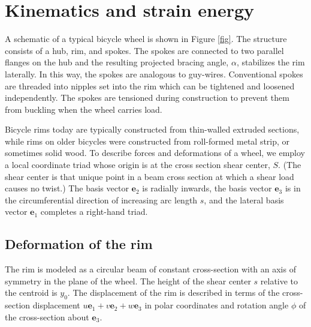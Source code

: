 \documentclass[\rootdir/thesis.tex]{subfiles}
\begin{document}
\section{Kinematics and strain energy}
A schematic of a typical bicycle wheel is shown in Figure \ref{fig}. The structure consists of a hub, rim, and spokes. The spokes are connected to two parallel flanges on the hub and the resulting projected bracing angle, $\alpha$,  stabilizes the rim laterally. In this way, the spokes are analogous to guy-wires. Conventional spokes are threaded into nipples set into the rim which can be tightened and loosened independently. The spokes are tensioned during construction to prevent them from buckling when the wheel carries load.

Bicycle rims today are typically constructed from thin-walled extruded sections, while rims on older bicycles were constructed from roll-formed metal strip, or sometimes solid wood. To describe forces and deformations of a wheel, we employ a local coordinate triad whose origin is at the cross section shear center, $S$. (The shear center is that unique point in a beam cross section at which a shear load causes no twist.) The basis vector $\mathbf{e}_2$ is radially inwards, the basis vector $\mathbf{e}_3$ is in the circumferential direction of increasing arc length $s$, and the lateral basis vector $\mathbf{e}_1$ completes a right-hand triad.

\subsection{Deformation of the rim}

The rim is modeled as a circular beam of constant cross-section with an axis of symmetry in the plane of the wheel. The height of the shear center $s$ relative to the centroid is $y_0$. The displacement of the rim is described in terms of the cross-section displacement $u\mathbf{e}_1 + v\mathbf{e}_2 + w\mathbf{e}_3$ in polar coordinates and rotation angle $\phi$ of the cross-section about $\mathbf{e}_3$.
\end{document}
